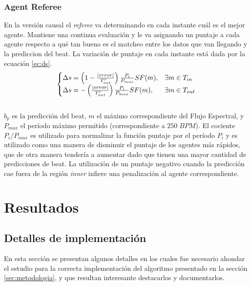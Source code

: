 \documentclass[12pt,a4paper,titlepage]{report}
\begin{document}
\subsection{Agent Referee}

En la versión causal el \emph{referee} va determinando en cada instante cuál es el mejor agente. Mantiene una continua evaluación y le va asignando un puntaje a cada agente respecto a qué tan bueno es el matcheo entre los datos que van llegando y la prediccion del beat. La variación de puntaje en cada instante está dada por la ecuación \ref{ec:ds}.\\

\begin{equation}
\begin{cases}
\Delta s = \left(1-\frac{|error|}{T^r_{out}} \right)\frac{P_i}{P_{max}}SF(m), & \exists m \in T_{in}\\
\Delta s = -\left(\frac{|error|}{T^r_{out}} \right)\frac{P_i}{P_{max}}SF(m), & \exists m \in T_{out}
\end{cases}
\label{ec:ds}\\
\end{equation}
\\
$b_p$ es la predicción del beat, $m$ el máximo correspondiente del Flujo Espectral, y $P_{max}$ el período máximo permitido (correspondiente a $250\;BPM$). El cociente $P_i/P_{max}$ es utilizado para normalizar la función puntaje por el período $P_i$ y es utilizado como una manera de disminuir el puntaje de los agentes más rápidos, que de otra manera tendería a aumentar dado que tienen una mayor cantidad de predicciones de beat. La utilización de un puntaje negativo cuando la predicción cae fuera de la región \emph{inner} infiere una penalización al agente correspondiente.\\

\chapter{Resultados}

\section{Detalles de implementación}
\label{sec:nosotros}

En esta sección se presentan algunos detalles en los cuales fue necesario ahondar el estudio para la correcta implementación del algoritmo presentado en la sección \ref{sec:metodologia}, y que resultan interesante destacarlos y documentarlos.\\
\end{document}
